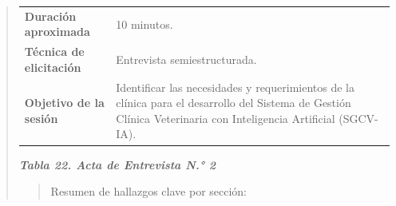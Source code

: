 \documentclass[
]{article}
\begin{document}
\begin{quote}
{\begin{longtable}[]{|
  >{\raggedright\arraybackslash}p{}|
  >{\raggedright\arraybackslash}p{}|}
\begin{minipage}[t]{\linewidth}
\end{minipage} \\
\hline
\textbf{Duración} \textbf{aproximada} & \begin{minipage}[t]{\linewidth}\raggedright
10 minutos.
\end{minipage} \\
\hline
\textbf{Técnica de} \textbf{elicitación} & \begin{minipage}[t]{\linewidth}\raggedright
Entrevista semiestructurada.
\end{minipage} \\
\hline
\textbf{Objetivo de la} \textbf{sesión} & \begin{minipage}[t]{\linewidth}\raggedright
Identificar las necesidades y requerimientos de la clínica para el
desarrollo del Sistema de Gestión Clínica Veterinaria con Inteligencia Artificial (SGCV-IA).
\end{minipage} \\
\hline
\end{longtable}
}

\protect{}\label{_bookmark81}{}\emph{\textbf{Tabla 22. Acta
de Entrevista N.° 2}}

\begin{quote}
Resumen de hallazgos clave por sección:
\end{quote}


\end{quote}
\end{document}
